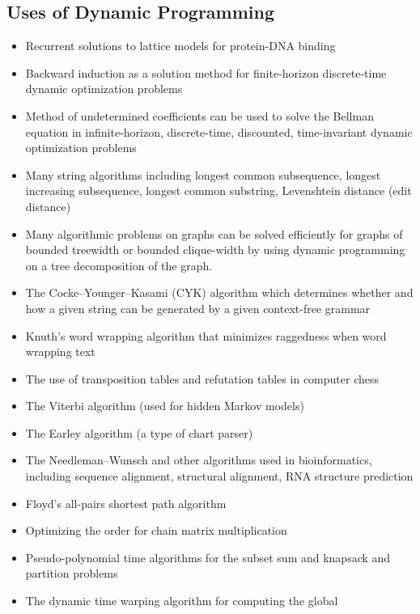 \begin{slide}
\section[-2]{Uses of Dynamic Programming}

\begin{PauseHighLight}
  \begin{itemize}\small\squeeze
  \item Recurrent solutions to lattice models for protein-DNA binding
  \item Backward induction as a solution method for finite-horizon
    discrete-time dynamic optimization problems 
  \item Method of undetermined coefficients can be used to solve the
    Bellman equation in infinite-horizon, discrete-time, discounted,
    time-invariant dynamic optimization problems 
  \item Many string algorithms including longest common subsequence,
    longest increasing subsequence, longest common substring,
    Levenshtein distance (edit distance) 
  \item Many algorithmic problems on graphs can be solved efficiently
    for graphs of bounded treewidth or bounded clique-width by using
    dynamic programming on a tree decomposition of the graph. 
  \item The Cocke–Younger–Kasami (CYK) algorithm which determines
    whether and how a given string can be generated by a given
    context-free grammar 
  \item Knuth's word wrapping algorithm that minimizes raggedness when
    word wrapping text 
  \item The use of transposition tables and refutation tables in
    computer chess 
  \item The Viterbi algorithm (used for hidden Markov models)
  \item The Earley algorithm (a type of chart parser)
  \item The Needleman–Wunsch and other algorithms used in
    bioinformatics, including sequence alignment, structural alignment,
    RNA structure prediction 
  \item Floyd's all-pairs shortest path algorithm
  \item Optimizing the order for chain matrix multiplication
  \item Pseudo-polynomial time algorithms for the subset sum and
    knapsack and partition problems 
  \item The dynamic time warping algorithm for computing the global

\end{itemize}
\end{PauseHighLight}
\end{slide}
